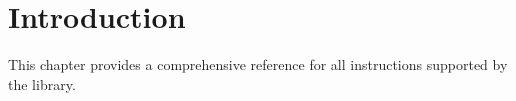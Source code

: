 \section{Introduction}

This chapter provides a comprehensive reference for all   instructions supported by the library.

